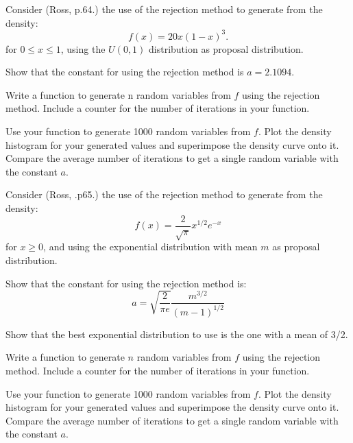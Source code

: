 \begin{exercise}
Consider (Ross, p.64.) the use of the rejection method to generate from the density:
$$f(x)=20x(1-x)^3.$$
for $0 \leq x\leq   1$, using the $U (0, 1)$ distribution as proposal distribution.
\begin{asparaenum}[(a)]
\item Show that the constant for using the rejection method is $a = 2.1094$.

\item Write a \Matlab function to generate n random variables from $f$ using the rejection method. Include a counter for the number of iterations in your function.

\item Use your \Matlab function to generate 1000 random variables from $f$. Plot the density histogram for your generated values and superimpose the density curve onto it. Compare the average number of iterations to get a single random variable with the constant $a$.

\end{asparaenum}
\end{exercise}

\begin{exercise}
Consider (Ross, .p65.) the use of the rejection method to generate from the density:
$$f(x)=\frac{2}{\sqrt{\pi}}x^{1/2}e^{-x}$$
for $x\geq 0$, and using the exponential distribution with mean $m$ as proposal distribution.


\begin{asparaenum}[(a)]
\item Show that the constant for using the rejection method is:
$$a=\sqrt{\frac{2}{\pi e}}\frac{m^{3/2}}{(m-1)^{1/2}}$$

\item Show that the best exponential distribution to use is the one with a mean of 3/2.

\item	Write a \Matlab function to generate $n$ random variables from $f$ using the rejection method. Include a counter for the number of iterations in your function.

\item	Use your \Matlab function to generate 1000 random variables from $f$. Plot the density histogram for your generated values and superimpose the density curve onto it. Compare the average number of iterations to get a single random variable with the constant $a$.
\end{asparaenum}
\end{exercise}

